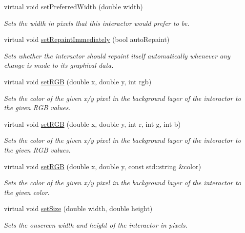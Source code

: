 \begin{DoxyCompactItemize}
virtual void \mbox{\hyperlink{classGInteractor_a3db429ab2fa52efd187eec0ed8cdd9f2}{set\+Preferred\+Width}} (double width)
\begin{DoxyCompactList}\small\item\em Sets the width in pixels that this interactor would prefer to be. \end{DoxyCompactList}\item 
virtual void \mbox{\hyperlink{classGDrawingSurface_abf5590a3992dcb7896ed449e65961da3}{set\+Repaint\+Immediately}} (bool auto\+Repaint)
\begin{DoxyCompactList}\small\item\em Sets whether the interactor should repaint itself automatically whenever any change is made to its graphical data. \end{DoxyCompactList}\item 
virtual void \mbox{\hyperlink{classGDrawingSurface_a8bcbd65fa784bdab1e66a9efd381162d}{set\+R\+GB}} (double x, double y, int rgb)
\begin{DoxyCompactList}\small\item\em Sets the color of the given x/y pixel in the background layer of the interactor to the given R\+GB values. \end{DoxyCompactList}\item 
virtual void \mbox{\hyperlink{classGDrawingSurface_a81202471d4fc9f2015aef0bc073acfab}{set\+R\+GB}} (double x, double y, int r, int g, int b)
\begin{DoxyCompactList}\small\item\em Sets the color of the given x/y pixel in the background layer of the interactor to the given R\+GB values. \end{DoxyCompactList}\item 
virtual void \mbox{\hyperlink{classGDrawingSurface_ae9a228792d4bb4b628350f39eaa3ad12}{set\+R\+GB}} (double x, double y, const std\+::string \&color)
\begin{DoxyCompactList}\small\item\em Sets the color of the given x/y pixel in the background layer of the interactor to the given color. \end{DoxyCompactList}\item 
virtual void \mbox{\hyperlink{classGInteractor_aca25d49481f9bf5fc8f7df4c086c4ce7}{set\+Size}} (double width, double height)
\begin{DoxyCompactList}\small\item\em Sets the onscreen width and height of the interactor in pixels. \end{DoxyCompactList}\item 

\end{DoxyCompactItemize}
